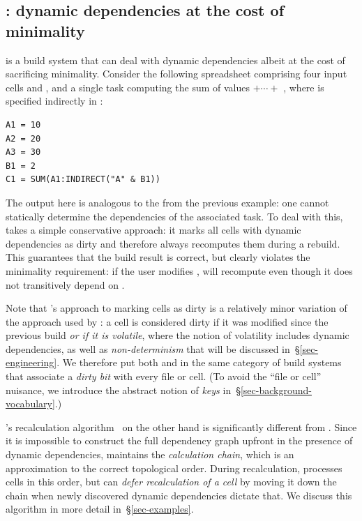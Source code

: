 \subsection{\Excel: dynamic dependencies at the cost of minimality}
\label{sec-background-excel}

\Excel is a build system that can deal with dynamic dependencies albeit at the
cost of sacrificing minimality. Consider the following spreadsheet comprising
four input cells  and , and a single task computing the sum
of values  $+\cdots+$ , where  is specified indirectly in
:

\vspace{1mm}
\begin{verbatim}
A1 = 10
A2 = 20
A3 = 30
B1 = 2
C1 = SUM(A1:INDIRECT("A" & B1))
\end{verbatim}
\vspace{1mm}

\noindent
The output  here is analogous to the  from the previous
example: one cannot statically determine the dependencies of the associated task.
To deal with this, \Excel takes a simple conservative approach: it marks all
cells with dynamic dependencies as dirty and therefore always recomputes them
during a rebuild. This guarantees that the build result is correct, but clearly
violates the minimality requirement: if the user modifies , \Excel will
recompute  even though it does not transitively depend on .

Note that \Excel's approach to marking cells as dirty is a relatively minor
variation of the approach used by \Make: a cell is considered dirty if it was
modified since the previous build \emph{or if it is volatile}, where the notion
of volatility includes dynamic dependencies, as well as \emph{non-determinism}
that will be discussed in~\S\ref{sec-engineering}. We therefore put both \Make
and \Excel in the same category of build systems that associate a \emph{dirty bit}
with every file or cell. (To avoid the ``file or cell'' nuisance, we introduce the
abstract notion of \emph{keys} in~\S\ref{sec-background-vocabulary}.)

\Excel's recalculation algorithm~\cite{excel_recalc} on the other hand is
significantly different from \Make. Since it is impossible to construct the full
dependency graph upfront in the presence of dynamic dependencies, \Excel
maintains the \emph{calculation chain}, which is an approximation to the correct
topological order. During recalculation, \Excel processes cells in this order,
but can \emph{defer recalculation of a cell} by moving it down the chain when newly
discovered dynamic dependencies dictate that. We discuss this algorithm in more
detail in~\S\ref{sec-examples}.

